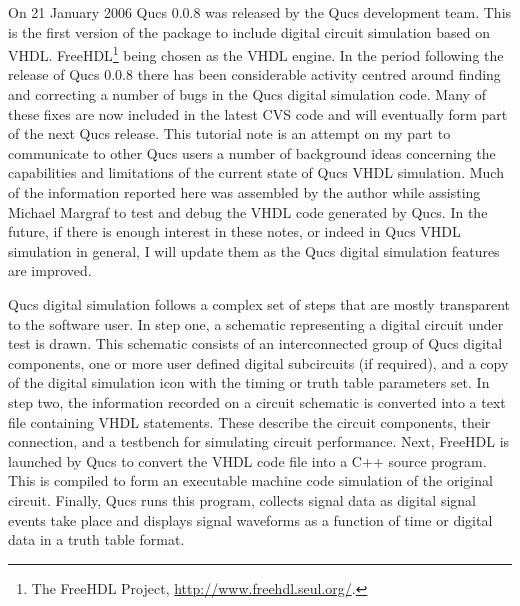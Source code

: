 %
%
%
%

\renewcommand{\thesubfigure}{\thefigure(\alph{subfigure})}
\makeatletter
  \renewcommand{\@thesubfigure}{\thesubfigure:\space}
  \renewcommand{\p@subfigure}{}
\makeatother

\renewcommand{\thesubtable}{\thetable(\alph{subtable})}
\makeatletter
  \renewcommand{\@thesubtable}{\thesubtable:\space}
  \renewcommand{\p@subtable}{}
\makeatother


On 21 January 2006 Qucs 0.0.8 was released by the Qucs development
team.  This is the first version of the package to include digital
circuit simulation based on VHDL.  FreeHDL\footnote{The FreeHDL
Project, \url{http://www.freehdl.seul.org/}. } being chosen as the
VHDL engine.  In the period following the release of Qucs 0.0.8 there
has been considerable activity centred around finding and correcting a
number of bugs in the Qucs digital simulation code.  Many of these
fixes are now included in the latest CVS code and will eventually form
part of the next Qucs release.  This tutorial note is an attempt on my
part to communicate to other Qucs users a number of background ideas
concerning the capabilities and limitations of the current state of
Qucs VHDL simulation.  Much of the information reported here was
assembled by the author while assisting Michael Margraf to test and
debug the VHDL code generated by Qucs.  In the future, if there is
enough interest in these notes, or indeed in Qucs VHDL simulation in
general, I will update them as the Qucs digital simulation features
are improved.

\addvspace{12pt}

Qucs digital simulation follows a complex set of steps that are mostly
transparent to the software user.  In step one, a schematic
representing a digital circuit under test is drawn.  This schematic
consists of an interconnected group of Qucs digital components, one or
more user defined digital subcircuits (if required), and a copy of the
digital simulation icon with the timing or truth table parameters set.
In step two, the information recorded on a circuit schematic is
converted into a text file containing VHDL statements. These describe
the circuit components, their connection, and a testbench for
simulating circuit performance.  Next, FreeHDL is launched by Qucs to
convert the VHDL code file into a C++ source program.  This is
compiled to form an executable machine code simulation of the original
circuit.  Finally, Qucs runs this program, collects signal data as
digital signal events take place and displays signal waveforms as a
function of time or digital data in a truth table format.

